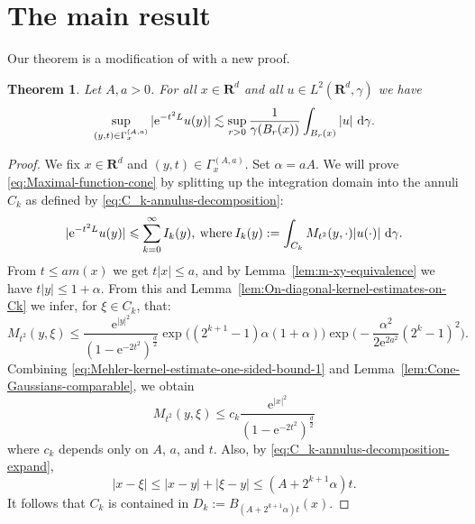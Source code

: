 \documentclass{amsart}
\newtheorem{theorem}{Theorem}
\theoremstyle{remark}
\newcommand{\D}{\,\textup{d}}
\newcommand{\LHG}{{L^2(\R^d,\gamma)}}
\renewcommand{\leq}{\leqslant}
\renewcommand{\leq}{\leqslant}
\newcommand{\R}{\mathbf R}
\newcommand{\e}{\mathrm{e}} %
\renewcommand{\leq}{\leqslant}%
\begin{document}
\section{The main result}
Our theorem is a modification of \cite[lemma 1.1]{Pineda2008} with a new proof.
\begin{theorem}\label{thm:Gaussian-maximal-function}
  Let $A, a > 0$. For all $x\in \R^d$ and all $u \in \LHG$ we have
  \begin{equation}
    \label{eq:Maximal-function-cone}
    \sup_{(y, t) \in \Gamma_x^{(A, a)}} |\e^{-t^2 L} u(y)| \lesssim
    \sup_{r > 0} \frac1{\gamma(B_r(x))}\int_{B_r(x)} |u| \, \D\gamma.
  \end{equation}
\end{theorem}
\begin{proof}
  We fix $x \in \R^d$ and $ (y, t) \in \Gamma_x^{(A, a)}$. 
  Set $\alpha = aA$. 
  We will prove \eqref{eq:Maximal-function-cone} by splitting up the
  integration domain into the annuli $C_k$ as defined by
  \eqref{eq:C_k-annulus-decomposition}: 
  \begin{equation}
    \label{eq:Maximal-function-cone-intermediate-step-1}
    |\e^{-t^2 L} u(y)| \leq \sum_{k = 0}^\infty I_k(y),
    \:\text{where}\: I_k(y) := \int_{C_k} M_{t^2}(y, \cdot) |u(\cdot)|
    \,\D\gamma.
  \end{equation} 
  From $t \leq a m(x)$ we get $t |x| \leq a$, and by
  Lemma~\ref{lem:m-xy-equivalence} we have $t |y| \leq 1 + \alpha$. From this
  and Lemma~\ref{lem:On-diagonal-kernel-estimates-on-Ck} we infer, for $\xi \in
  C_k$, that:
  \begin{equation}
    \label{eq:Mehler-kernel-estimate-one-sided-bound-1}
    M_{t^2}(y, \xi) \leq  \frac{\e^{|y|^2}}{(1 - \e^{-2t^2})^{\frac{d}2}}
    \exp\bigl((2^{k + 1} - 1) \alpha (1 + \alpha) \bigr)
    \exp\Big(\!-\!\frac{\alpha^2}{2 \e^{2a^2}} (2^k - 1)^2 \Big).
  \end{equation}
  Combining \eqref{eq:Mehler-kernel-estimate-one-sided-bound-1} and
  Lemma~\ref{lem:Cone-Gaussians-comparable}, we obtain
  \begin{equation*}
    M_{t^2}(y, \xi) \leq  c_k\frac{\e^{|x|^2}}{(1 - \e^{-2t^2})^{\frac{d}2}}
  \end{equation*}       
  where $c_k$ depends only on $A$, $a$, and $t$. Also, by
  \eqref{eq:C_k-annulus-decomposition-expand},
  \begin{equation*}
    |x - \xi| \leq |x - y| + |\xi - y| \leq (A + 2^{k + 1}\alpha)t .
  \end{equation*}
  It follows that $ C_k$ is contained in $D_k := B_{(A +2^{k + 1}\alpha)t}(x)$.


\end{proof}
\end{document}
